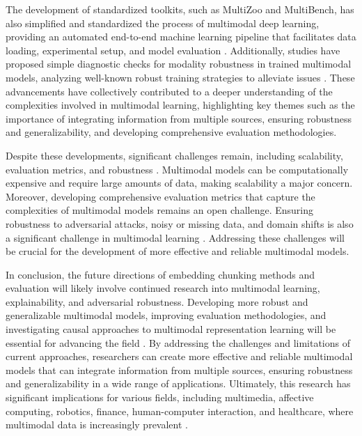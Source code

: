 \documentclass[conference]{IEEEtran}
\begin{document}
The development of standardized toolkits, such as MultiZoo and MultiBench, has also simplified and standardized the process of multimodal deep learning, providing an automated end-to-end machine learning pipeline that facilitates data loading, experimental setup, and model evaluation \cite{b5}. Additionally, studies have proposed simple diagnostic checks for modality robustness in trained multimodal models, analyzing well-known robust training strategies to alleviate issues \cite{b6}. These advancements have collectively contributed to a deeper understanding of the complexities involved in multimodal learning, highlighting key themes such as the importance of integrating information from multiple sources, ensuring robustness and generalizability, and developing comprehensive evaluation methodologies.

Despite these developments, significant challenges remain, including scalability, evaluation metrics, and robustness \cite{b7}. Multimodal models can be computationally expensive and require large amounts of data, making scalability a major concern. Moreover, developing comprehensive evaluation metrics that capture the complexities of multimodal models remains an open challenge. Ensuring robustness to adversarial attacks, noisy or missing data, and domain shifts is also a significant challenge in multimodal learning \cite{b8}. Addressing these challenges will be crucial for the development of more effective and reliable multimodal models.

In conclusion, the future directions of embedding chunking methods and evaluation will likely involve continued research into multimodal learning, explainability, and adversarial robustness. Developing more robust and generalizable multimodal models, improving evaluation methodologies, and investigating causal approaches to multimodal representation learning will be essential for advancing the field \cite{b9}. By addressing the challenges and limitations of current approaches, researchers can create more effective and reliable multimodal models that can integrate information from multiple sources, ensuring robustness and generalizability in a wide range of applications. Ultimately, this research has significant implications for various fields, including multimedia, affective computing, robotics, finance, human-computer interaction, and healthcare, where multimodal data is increasingly prevalent \cite{b10}.
\end{document}
